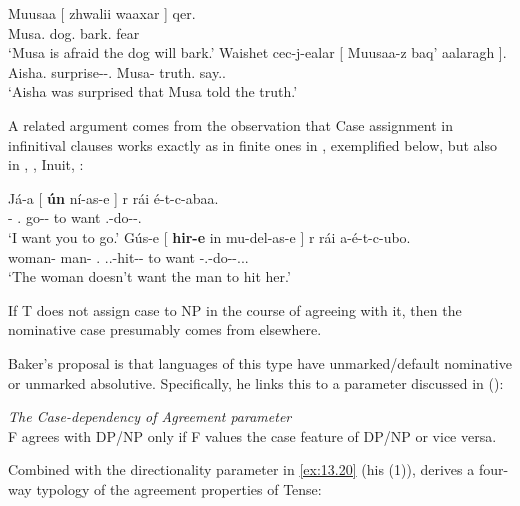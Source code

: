 \documentclass[output=paper]{langsci/langscibook}
\begin{document}
\ea%
    \label{ex:13.17} \parencite[551, 550]{Nichols2011}
	\ea
	\gll  Muusaa  [ zhwalii waaxar ]  qer.\\
            Musa.\Abs{} {} dog.\Abs{}  bark.\Vn{} {} fear\\
	\glt     ‘Musa is afraid the dog will bark.’
	\ex
	\gll  Waishet cec-j-ealar  [ Muusaa-z baq’  aalaragh ].\\
            Aisha.\Abs{}  surprise-\Jj-\Lv{}.\Pst{} {}  Musa-\Erg{} truth.\Abs{}  say.\Vn{}.\Lat{} {}\\
	\glt     ‘Aisha was surprised that Musa told the truth.’
    \z
\z

A related argument comes from the observation that Case assignment in
infinitival clauses works exactly as in finite ones in ,
exemplified below, but also in , , 
Inuit, :

\ea%
    \label{ex:13.18} \parencite[44]{Baker2015}
	\ea
	\gll   Já-a  [ \textbf{ún}  ní-as-e ]                r rái é-t-c-abaa.\\
    \Fsg-\Erg{} {} \Ssg.\Abs{}  go-\Inf{}-\Obl{} {} to want \Tsg.\Obj{}-do-\Npst-\Fsg{}.\Prs{}\\
	\glt     ‘I want you to go.’
	\ex
	\gll  Gús-e  [ \textbf{hir-e}  in mu-del-as-e ]                                     r rái a-é-t-c-ubo.\\
    woman-\Erg{} {}  man-\Erg{}  \Tsg{}.\Abs{} \Third.\glossF{}.\Obj{}-hit-\Inf{}-\Obl{} {} to want \Neg{}-\Tsg.\Obj{}-do-\Npst{}-\Third.\glossF.\Sbj{}.\Prs{}\\
	\glt     ‘The woman doesn’t want the man to hit her.’
    \z
\z

If T does not assign case to NP in the course of agreeing with it, then the
nominative case presumably comes from elsewhere.

Baker’s proposal is that languages of this type have unmarked/default
nominative or unmarked absolutive. Specifically, he links this to a parameter
discussed in \citeauthor{Baker2008} (\citeyear[155, (2)]{Baker2008}):

\ea%
    \label{ex:13.19}
    \emph{The Case-dependency of Agreement parameter}\\
    F agrees with DP/NP only if F values the case feature of DP/NP or vice
    versa.
\z

Combined with the directionality parameter in \eqref{ex:13.20} (his (1)),
\citet{Baker2008} derives a four-way typology of the agreement properties of
Tense:
\end{document}
